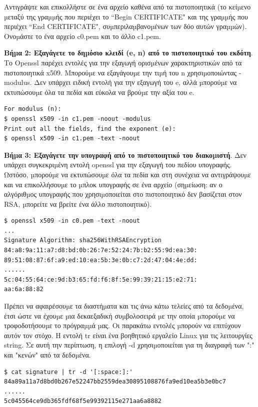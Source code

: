 \noindent
Αντιγράψτε και επικολλήστε σε ένα αρχείο καθένα από τα πιστοποιητικά (το κείµενο µεταξύ
της γραµµής που περιέχει το “Begin CERTIFICATE" και της γραµµής που περιέχει “End
CERTIFICATE", συµπεριλαµβανοµένων των δύο αυτών γραµµών). Ονοµάστε το ένα αρχείο
c0.pem και το άλλο c1.pem.

\noindent
\textbf{Βήµα 2: Εξαγάγετε το δηµόσιο κλειδί (e, n) από το πιστοποιητικό του εκδότη}. Το Openssl
παρέχει εντολές για την εξαγωγή ορισµένων χαρακτηριστικών από τα πιστοποιητικά x509.
Μπορούµε να εξαγάγουµε την τιµή του n χρησιµοποιώντας -modulus. Δεν υπάρχει ειδική
εντολή για την εξαγωγή του e, αλλά µπορούµε να εκτυπώσουµε όλα τα πεδία και εύκολα να
βρούµε την αξία του e.

\begin{lstlisting}
For modulus (n):
$ openssl x509 -in c1.pem -noout -modulus
Print out all the fields, find the exponent (e):
$ openssl x509 -in c1.pem -text -noout
\end{lstlisting}

\noindent
\textbf{Βήµα 3: Εξαγάγετε την υπογραφή από το πιστοποιητικό του διακοµιστή}. Δεν υπάρχει
συγκεκριµένη εντολή openssl για την εξαγωγή του πεδίου υπογραφής. Ωστόσο, µπορούµε να
εκτυπώσουµε όλα τα πεδία και στη συνέχεια να αντιγράψουµε και να επικολλήσουµε το µπλοκ
υπογραφής σε ένα αρχείο (σηµείωση: αν ο αλγόριθµος υπογραφής που χρησιµοποιείται στο
πιστοποιητικό δεν βασίζεται στον RSA, µπορείτε να βρείτε ένα άλλο πιστοποιητικό).

\begin{lstlisting}
$ openssl x509 -in c0.pem -text -noout
...
Signature Algorithm: sha256WithRSAEncryption
84:a8:9a:11:a7:d8:bd:0b:26:7e:52:24:7b:b2:55:9d:ea:30:
89:51:08:87:6f:a9:ed:10:ea:5b:3e:0b:c7:2d:47:04:4e:dd:
......
5c:04:55:64:ce:9d:b3:65:fd:f6:8f:5e:99:39:21:15:e2:71:
aa:6a:88:82
\end{lstlisting}

\noindent
Πρέπει να αφαιρέσουµε τα διαστήµατα και τις άνω κάτω τελείες από τα δεδοµένα, έτσι ώστε να
έχουµε µια δεκαεξαδική συµβολοσειρά µε την οποία µπορούµε να τροφοδοτήσουµε το
πρόγραµµά µας. Οι παρακάτω εντολές µπορούν να επιτύχουν αυτόν τον στόχο. Η εντολή tr
είναι ένα βοηθητικό εργαλείο Linux για τις λειτουργίες string. Σε αυτή την περίπτωση, η
επιλογή -d χρησιµοποιείται για τη διαγραφή των ":" και "κενών" από τα δεδοµένα.

\begin{lstlisting}
$ cat signature | tr -d '[:space:]:'
84a89a11a7d8bd0b267e52247bb2559dea30895108876fa9ed10ea5b3e0bc7
......
5c045564ce9db365fdf68f5e99392115e271aa6a8882
\end{lstlisting}

